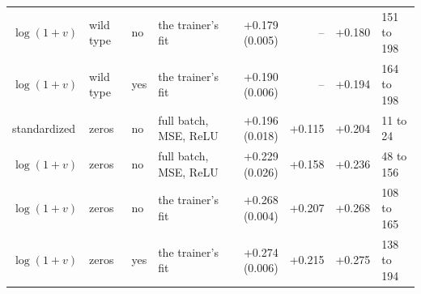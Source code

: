 \begin{table}[H]
\begin{tabular}{@{}llllrrrl@{}}
    $\log(1+v)$ & wild type & no & the trainer's fit & +0.179 (0.005) & -- & +0.180 & 151 to 198 \\
    $\log(1+v)$ & wild type & yes & the trainer's fit & +0.190 (0.006) & -- & +0.194 & 164 to 198 \\
    standardized & zeros & no & full batch, MSE, ReLU & +0.196 (0.018) & +0.115 & +0.204 & 11 to 24 \\
    $\log(1+v)$ & zeros & no & full batch, MSE, ReLU & +0.229 (0.026) & +0.158 & +0.236 & 48 to 156 \\
    $\log(1+v)$ & zeros & no & the trainer's fit & +0.268 (0.004) & +0.207 & +0.268 & 108 to 165 \\
    $\log(1+v)$ & zeros & yes & the trainer's fit & +0.274 (0.006) & +0.215 & +0.275 & 138 to 194 \\
    \hline
  \end{tabular}
\end{table}
